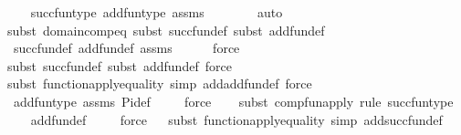 \begin{isabellebody}
\ \ \isamarkupfalse%
\ succ{\isacharunderscore}{\kern0pt}fun{\isacharunderscore}{\kern0pt}type\ add{\isacharunderscore}{\kern0pt}fun{\isacharunderscore}{\kern0pt}type\ assms\ \isanewline
\ \ \ \ \ \isamarkupfalse%
\ auto{\isacharbrackleft}{\kern0pt}{}{\isacharbrackright}{\kern0pt}\isanewline
\ \ \ \isamarkupfalse%
{\isacharparenleft}{\kern0pt}subst\ domain{\isacharunderscore}{\kern0pt}comp{\isacharunderscore}{\kern0pt}eq{\isacharcomma}{\kern0pt}\ subst\ succ{\isacharunderscore}{\kern0pt}fun{\isacharunderscore}{\kern0pt}def{\isacharcomma}{\kern0pt}\ subst\ add{\isacharunderscore}{\kern0pt}fun{\isacharunderscore}{\kern0pt}def{\isacharparenright}{\kern0pt}\isanewline
\ \ \isamarkupfalse%
\ succ{\isacharunderscore}{\kern0pt}fun{\isacharunderscore}{\kern0pt}def\ add{\isacharunderscore}{\kern0pt}fun{\isacharunderscore}{\kern0pt}def\ assms\isanewline
\ \ \ \ \isamarkupfalse%
\ force\isanewline
\ \ \ \isamarkupfalse%
{\isacharparenleft}{\kern0pt}subst\ succ{\isacharunderscore}{\kern0pt}fun{\isacharunderscore}{\kern0pt}def{\isacharcomma}{\kern0pt}\ subst\ add{\isacharunderscore}{\kern0pt}fun{\isacharunderscore}{\kern0pt}def{\isacharcomma}{\kern0pt}\ force{\isacharparenright}{\kern0pt}\isanewline
\ \ \isamarkupfalse%
{\isacharparenleft}{\kern0pt}subst\ function{\isacharunderscore}{\kern0pt}apply{\isacharunderscore}{\kern0pt}equality{\isacharcomma}{\kern0pt}\ simp\ add{\isacharcolon}{\kern0pt}add{\isacharunderscore}{\kern0pt}fun{\isacharunderscore}{\kern0pt}def{\isacharcomma}{\kern0pt}\ force{\isacharparenright}{\kern0pt}\isanewline
\ \ \isamarkupfalse%
\ add{\isacharunderscore}{\kern0pt}fun{\isacharunderscore}{\kern0pt}type\ assms\ Pi{\isacharunderscore}{\kern0pt}def\isanewline
\ \ \ \isamarkupfalse%
\ force\ \isanewline
\ \ \isamarkupfalse%
{\isacharparenleft}{\kern0pt}subst\ comp{\isacharunderscore}{\kern0pt}fun{\isacharunderscore}{\kern0pt}apply{\isacharcomma}{\kern0pt}\ rule\ succ{\isacharunderscore}{\kern0pt}fun{\isacharunderscore}{\kern0pt}type{\isacharparenright}{\kern0pt}\isanewline
\ \ \isamarkupfalse%
\ add{\isacharunderscore}{\kern0pt}fun{\isacharunderscore}{\kern0pt}def\isanewline
\ \ \ \isamarkupfalse%
\ force\isanewline
\ \ \isamarkupfalse%
{\isacharparenleft}{\kern0pt}subst\ {\isacharparenleft}{\kern0pt}{}{\isacharparenright}{\kern0pt}function{\isacharunderscore}{\kern0pt}apply{\isacharunderscore}{\kern0pt}equality{\isacharcomma}{\kern0pt}\ simp\ add{\isacharcolon}{\kern0pt}succ{\isacharunderscore}{\kern0pt}fun{\isacharunderscore}{\kern0pt}def{\isacharparenright}{\kern0pt}\isanewline

\end{isabellebody}
